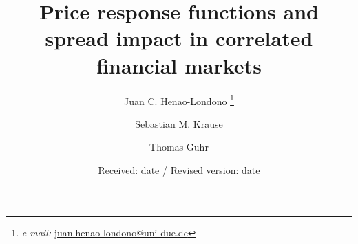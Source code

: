 \title{Price response functions and spread impact in correlated financial
       markets}
\author{Juan C. Henao-Londono
        \thanks{\emph{e-mail: }\href{mailto:juan.henao-londono@uni-due.de}
        {juan.henao-londono@uni-due.de}}
        \and Sebastian M. Krause
        \and Thomas Guhr}
\date{Received: date / Revised version: date}

